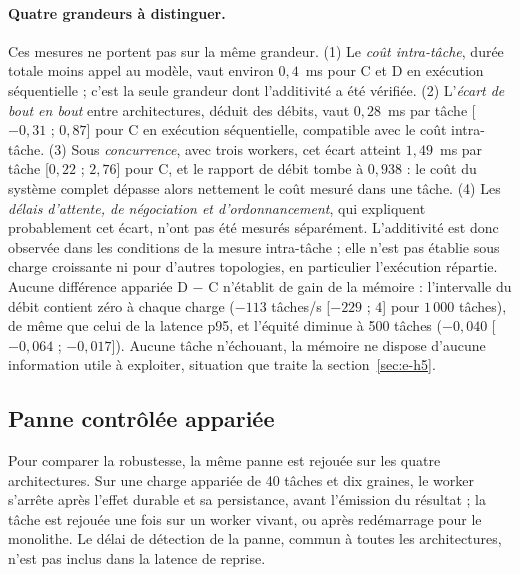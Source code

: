 \paragraph{Quatre grandeurs à distinguer.} Ces mesures ne portent pas sur la même grandeur. (1) Le \emph{coût intra-tâche}, durée totale moins appel au modèle, vaut environ $0{,}4$~ms pour C et D en exécution séquentielle ; c'est la seule grandeur dont l'additivité a été vérifiée. (2) L'\emph{écart de bout en bout} entre architectures, déduit des débits, vaut $0{,}28$~ms par tâche [$-0{,}31$ ; $0{,}87$] pour C en exécution séquentielle, compatible avec le coût intra-tâche. (3) Sous \emph{concurrence}, avec trois workers, cet écart atteint $1{,}49$~ms par tâche [$0{,}22$ ; $2{,}76$] pour C, et le rapport de débit tombe à $0{,}938$ : le coût du système complet dépasse alors nettement le coût mesuré dans une tâche. (4) Les \emph{délais d'attente, de négociation et d'ordonnancement}, qui expliquent probablement cet écart, n'ont pas été mesurés séparément. L'additivité est donc observée dans les conditions de la mesure intra-tâche ; elle n'est pas établie sous charge croissante ni pour d'autres topologies, en particulier l'exécution répartie. Aucune différence appariée D $-$ C n'établit de gain de la mémoire : l'intervalle du débit contient zéro à chaque charge ($-113$ tâches/s [$-229$ ; $4$] pour $1\,000$ tâches), de même que celui de la latence p95, et l'équité diminue à 500 tâches ($-0{,}040$ [$-0{,}064$ ; $-0{,}017$]). Aucune tâche n'échouant, la mémoire ne dispose d'aucune information utile à exploiter, situation que traite la section~\ref{sec:e-h5}.

\subsection{Panne contrôlée appariée}
\label{sec:panne-appariee}

Pour comparer la robustesse, la même panne est rejouée sur les quatre architectures. Sur une charge appariée de 40 tâches et dix graines, le worker s'arrête après l'effet durable et sa persistance, avant l'émission du résultat ; la tâche est rejouée une fois sur un worker vivant, ou après redémarrage pour le monolithe. Le délai de détection de la panne, commun à toutes les architectures, n'est pas inclus dans la latence de reprise.

